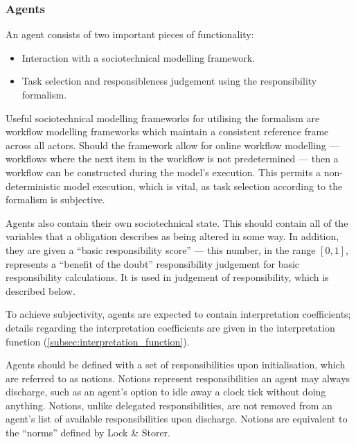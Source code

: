 \subsubsection{Agents}  %
An agent consists of two important pieces of functionality:

\begin{itemize}
    \item Interaction with a sociotechnical modelling framework.
    \item Task selection and responsibleness judgement using the responsibility formalism.
\end{itemize}

Useful sociotechnical modelling frameworks for utilising the formalism are workflow modelling frameworks which maintain a consistent reference frame across all actors. Should the framework allow for online workflow modelling --- workflows where the next item in the workflow is not predetermined --- then a workflow can be constructed during the model's execution. This permits a non-deterministic model execution, which is vital, as task selection according to the formalism is subjective.\par

Agents also contain their own sociotechnical state. This should contain all of the variables that a obligation describes as being altered in some way. In addition, they are given a ``basic responsibility score'' --- this number, in the range \([0,1]\), represents a ``benefit of the doubt'' responsibility judgement for basic responsibility calculations. It is used in judgement of responsibility, which is described below.\par

To achieve subjectivity, agents are expected to contain interpretation coefficients; details regarding the interpretation coefficients are given in the interpretation function (\cref{subsec:interpretation_function}).\par

Agents should be defined with a set of responsibilities upon initialisation, which are referred to as notions. Notions represent responsibilities an agent may always discharge, such as an agent's option to idle away a clock tick without doing anything. Notions, unlike delegated responsibilities, are not removed from an agent's list of available responsibilities upon discharge. Notions are equivalent to the ``norms'' defined by Lock \& Storer\cite{storer2008modelling}.\par

